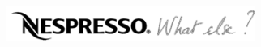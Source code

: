 \vspace{-0.5cm}
\begin{columns}[T]
  \begin{column}{0.26\textwidth}
    
    
  \end{column}
  \begin{column}{0.32\textwidth}
    
    \includegraphics[width=0.8\textwidth]{./figures/nespressoWhatElse.png}
    
  \end{column}  
  \begin{column}{0.42\textwidth}
    \vspace{+0.3cm}
    
    \hspace{1cm}
    
  \end{column}
\end{columns}



%
%  

%  
%    
%  
%  
%
%  
%  
%  


